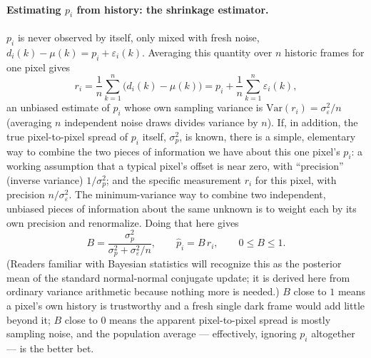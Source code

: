 \documentclass[11pt,a4paper]{article}
\begin{document}
\paragraph{Estimating $p_i$ from history: the shrinkage estimator.}
$p_i$ is never observed by itself, only mixed with fresh noise,
$d_i(k) - \mu(k) = p_i + \varepsilon_i(k)$. Averaging this quantity over
$n$ historic frames for one pixel gives
\[
r_i = \frac{1}{n}\sum_{k=1}^n \big(d_i(k) - \mu(k)\big)
= p_i + \frac{1}{n}\sum_{k=1}^n \varepsilon_i(k),
\]
an unbiased estimate of $p_i$ whose own sampling variance is
$\mathrm{Var}(r_i) = \sigma_\varepsilon^2 / n$ (averaging $n$ independent
noise draws divides variance by $n$). If, in addition, the true
pixel-to-pixel spread of $p_i$ itself, $\sigma_p^2$, is known, there is a
simple, elementary way to combine the two pieces of information we have
about this one pixel's $p_i$: a working assumption that a typical pixel's
offset is near zero, with ``precision'' (inverse variance) $1/\sigma_p^2$;
and the specific measurement $r_i$ for this pixel, with precision
$n/\sigma_\varepsilon^2$. The minimum-variance way to combine two
independent, unbiased pieces of information about the same unknown is to
weight each by its own precision and renormalize. Doing that here gives
\begin{equation}
B = \frac{\sigma_p^2}{\sigma_p^2 + \sigma_\varepsilon^2/n}, \qquad
\hat p_i = B \, r_i, \qquad 0 \le B \le 1.
\label{eq:shrinkage}
\end{equation}
(Readers familiar with Bayesian statistics will recognize this as the
posterior mean of the standard normal-normal conjugate update; it is
derived here from ordinary variance arithmetic because nothing more is
needed.) $B$ close to $1$ means a pixel's own history is trustworthy and a
fresh single dark frame would add little beyond it; $B$ close to $0$ means
the apparent pixel-to-pixel spread is mostly sampling noise, and the
population average --- effectively, ignoring $p_i$ altogether --- is the
better bet.
\end{document}
